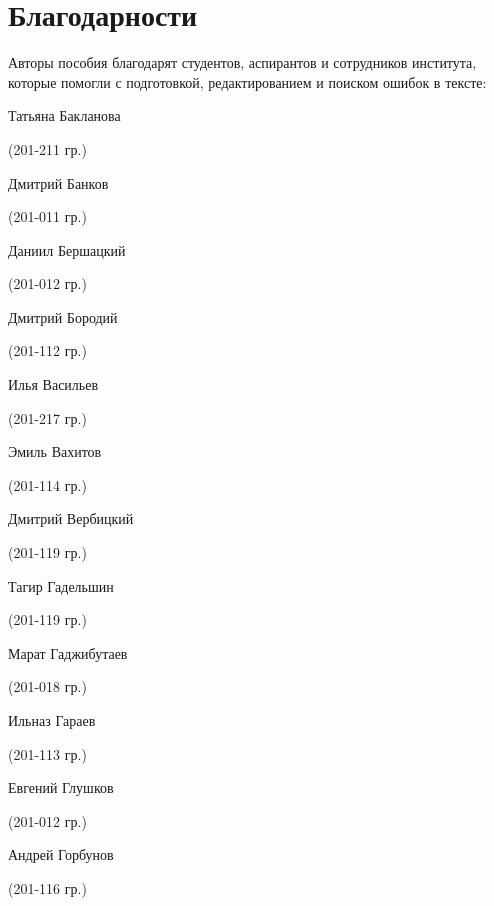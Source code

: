 \section*{Благодарности}
Авторы пособия благодарят студентов, аспирантов и сотрудников института, которые помогли с подготовкой, редактированием и поиском ошибок в тексте:

\begin{multicols}{2}
\begin{small}
\begin{enumerate*}\itemsep1pt \parskip0pt 
	\item Татьяна Бакланова\begin{tiny} (201-211 гр.)\end{tiny}
	\item Дмитрий Банков\begin{tiny} (201-011 гр.)\end{tiny}
	\item Даниил Бершацкий\begin{tiny} (201-012 гр.)\end{tiny}
	\item Дмитрий Бородий\begin{tiny} (201-112 гр.)\end{tiny}
	\item Илья Васильев\begin{tiny} (201-217 гр.)\end{tiny}
	\item Эмиль Вахитов\begin{tiny} (201-114 гр.)\end{tiny}
	\item Дмитрий Вербицкий\begin{tiny} (201-119 гр.)\end{tiny}
	\item Тагир Гадельшин\begin{tiny} (201-119 гр.)\end{tiny}
	\item Марат Гаджибутаев\begin{tiny} (201-018 гр.)\end{tiny}
	\item Ильназ Гараев\begin{tiny} (201-113 гр.)\end{tiny}
	\item Евгений Глушков\begin{tiny} (201-012 гр.)\end{tiny}
	\item Андрей Горбунов\begin{tiny} (201-116 гр.)\end{tiny}

\end{enumerate*}
\end{small}
\end{multicols}
